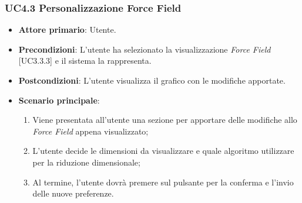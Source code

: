 \subsubsection{UC4.3 Personalizzazione Force Field}
\begin{itemize}
	\item \textbf{Attore primario}: Utente.
	\item \textbf{Precondizioni}: L'utente ha selezionato la visualizzazione \textit{Force Field} [UC3.3.3] e il sistema la rappresenta.
	\item \textbf{Postcondizioni}: L'utente visualizza il grafico con le modifiche apportate.
	\item \textbf{Scenario principale}:
	\begin{enumerate}
			\item Viene presentata all'utente una sezione per apportare delle modifiche allo \textit{Force Field} appena visualizzato;
			\item L'utente decide le dimensioni da visualizzare e quale algoritmo utilizzare per la riduzione dimensionale;
			\item Al termine, l'utente dovrà premere sul pulsante per la conferma e l'invio delle nuove preferenze.
		\end{enumerate}
\end{itemize}